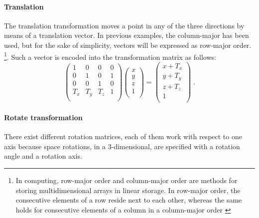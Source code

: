 \documentclass[12pt,a4paper]{extarticle}
\begin{document}
\paragraph{Translation} The translation transformation moves a point in any of the three directions by means of a translation vector. In previous examples, the column-major has been used, but for the sake of simplicity, vectors will be expressed as row-major order. \footnote{In computing, row-major order and column-major order are methods for storing multidimensional arrays in linear storage. In row-major order, the consecutive elements of a row reside next to each other, whereas the same holds for consecutive elements of a column in a column-major order  \cite{wiki_row_major:1}}. 
Such a vector is encoded into the transformation matrix as follows:
\[
\begin{pmatrix}
1 & 0 & 0 & 0\\
0 & 1 & 0 & 1\\
0 & 0 & 1 & 0\\
T_{x} & T_{y} & T_{z} & 1\\
\end{pmatrix}
\begin{pmatrix}
x\\y\\z\\1\\
\end{pmatrix}
 = 
\begin{pmatrix}
x+T_{x}\\y+T_{y}\\z+T_{z}\\1\\
\end{pmatrix}
 \;.
\]
\paragraph{Rotate transformation} There exist different rotation matrices, each of them work with respect to one axis because space rotations, in a 3-dimensional, are specified with a rotation angle and a rotation axis.
\end{document}
